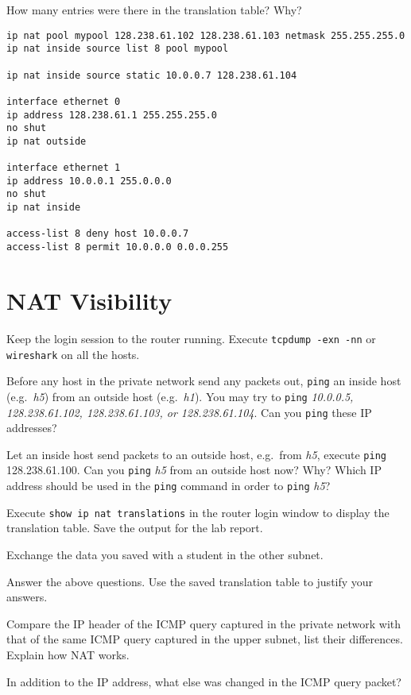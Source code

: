 \documentclass{../UTNetLab}
\begin{document}
    \begin{report}
    \item How many entries were there in the translation table? Why?
    \end{report}
    
    \begin{lstlisting}[language={cisco}, emph={mypool}, caption={NAT Router Configuration in Fig. 8.7}]
ip nat pool mypool 128.238.61.102 128.238.61.103 netmask 255.255.255.0
ip nat inside source list 8 pool mypool

ip nat inside source static 10.0.0.7 128.238.61.104

interface ethernet 0
ip address 128.238.61.1 255.255.255.0
no shut
ip nat outside

interface ethernet 1
ip address 10.0.0.1 255.0.0.0
no shut
ip nat inside

access-list 8 deny host 10.0.0.7
access-list 8 permit 10.0.0.0 0.0.0.255
    \end{lstlisting}

\section{NAT Visibility}
    Keep the login session to the router running. Execute \lstinline{tcpdump -exn -nn} or \lstinline{wireshark} on all the hosts. 

    Before any host in the private network send any packets out, \lstinline{ping} an inside host (e.g.\ \textit{h5}) from an outside host (e.g.\ \textit{h1}). You may try to \lstinline{ping} \textit{10.0.0.5, 128.238.61.102, 128.238.61.103, or 128.238.61.104}. Can you \lstinline{ping} these IP addresses? 

    Let an inside host send packets to an outside host, e.g.\ from \textit{h5}, execute \lstinline{ping} 128.238.61.100. Can you \lstinline{ping} \textit{h5} from an outside host now? Why? Which IP address should be used in the \lstinline{ping} command in order to \lstinline{ping} \textit{h5}? 

    Execute \lstinline[language=cisco]{show ip nat translations} in the router login window to display the translation table. Save the output for the lab report. 

    Exchange the data you saved with a student in the other subnet.

    \begin{report}
    \item Answer the above questions.
    Use the saved translation table to justify your answers.
    
    \item Compare the IP header of the ICMP query captured in the private network with that of the same ICMP query captured in the upper subnet, list their differences.
    Explain how NAT works.
    
    \item In addition to the IP address, what else was changed in the ICMP query packet?
    \end{report}
\end{document}
